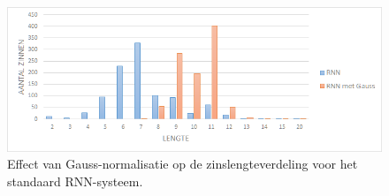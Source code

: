 \begin{figure}[tb]
	\centering
	\includegraphics[width=\textwidth]{Images/gauss_length.PNG}
	\caption[Effect van gauss-normalisatie op de zinslengteverdeling]{Effect van Gauss-normalisatie op de zinslengteverdeling voor het standaard RNN-systeem.}
	\label{fig:gauss}
\end{figure}  
